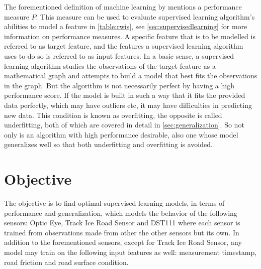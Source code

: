	The forementioned definition of machine learning by \cite{BOOK:2} mentions a performance measure $P$. This measure can be used to evaluate supervised learning algorithm's abilities to model a feature in \ref{table:rwis}, see \ref{sec:supervisedlearning} for more information on performance measures. A specific feature that is to be modelled is referred to as target feature, and the features a supervised learning algorithm uses to do so is referred to as input features. In a basic sense, a supervised learning algorithm studies the observations of the target feature as a mathematical graph and attempts to build a model that best fits the observations in the graph. But the algorithm is not necessarily perfect by having a high performance score. If the model is built in such a way that it fits the provided data perfectly, which may have outliers etc, it may have difficulties in predicting new data. This condition is known as overfitting, the opposite is called underfitting, both of which are covered in detail in \ref{sec:generalization}. So not only is an algorithm with high performance desirable, also one whose model generalizes well so that both underfitting and overfitting is avoided.

\section{Objective} \label{sec:objective}
	The objective is to find optimal supervised learning models, in terms of performance and generalization, which models the behavior of the following sensors: Optic Eye, Track Ice Road Sensor and DST111 where each sensor is trained from observations made from other the other sensors but its own. In addition to the forementioned sensors, except for Track Ice Road Sensor, any model may train on the following input features as well: measurement timestamp, road friction and road surface condition.
	
